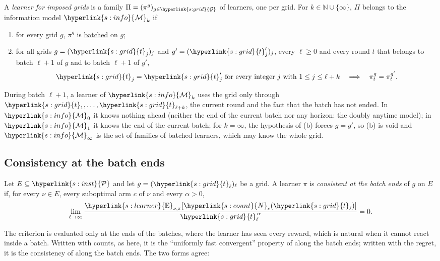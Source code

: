 \documentclass[11pt]{article}
\newcommand{\dt}[1]{\hypertarget{#1}{}}
\newcommand{\sy}[2]{{\hyperlink{#1}{#2}}}
\newcommand{\term}[2]{\hyperlink{#1}{#2}}
\newcommand{\1}{\mathbf{1}}
\newcommand{\Nat}{\mathbb{N}}
\newcommand{\cP}{\sy{s:inst}{\mathcal P}}
\newcommand{\Enu}{\sy{s:learner}{\mathbb E}}
\newcommand{\Ng}{\sy{s:count}{N}}
\newcommand{\Gr}{\sy{s:grid}{\mathcal G}}
\newcommand{\tl}{\sy{s:grid}{t}}
\newcommand{\Mk}[1]{\sy{s:info}{\mathcal M}_{#1}}
\newcommand{\batched}{\term{t:batched}{batched}}
\begin{document}
\begin{definition}\label{def:infomodel}
\dt{s:info}A \emph{learner for imposed grids} is a family $\Pi=(\pi^g)_{g\in\Gr}$ of learners, one
per grid. For $k\in\Nat\cup\{\infty\}$, $\Pi$ belongs to the information model $\Mk{k}$ if
\begin{enumerate}[label=(\alph*)]
\item for every grid $g$, $\pi^g$ is \batched{} on $g$;
\item for all grids $g=(\tl_j)_j$ and $g'=(\tl'_j)_j$, every $\ell\ge0$ and every round $t$ that
  belongs to batch $\ell+1$ of $g$ and to batch $\ell+1$ of $g'$,
  \begin{equation*}
    \tl_j=\tl'_j\ \text{for every integer}\ j\ \text{with}\ 1\le j\le\ell+k
    \quad\Longrightarrow\quad\pi^g_t=\pi^{g'}_t .
  \end{equation*}
\end{enumerate}
\end{definition}

During batch $\ell+1$, a learner of $\Mk{k}$ uses the grid only through $\tl_1,\dots,\tl_{\ell+k}$,
the current round and the fact that the batch has not ended. In $\Mk{0}$ it knows nothing ahead
(neither the end of the current batch nor any horizon: the doubly anytime model); in $\Mk{1}$ it
knows the end of the current batch; for $k=\infty$, the hypothesis of (b) forces $g=g'$, so (b) is
void and $\Mk{\infty}$ is the set of families of batched learners, which may know the whole grid.

\subsection{Consistency at the batch ends}

\begin{definition}\label{def:consistent}
\dt{t:cons}Let $E\subseteq\cP$ and let $g=(\tl_\ell)_\ell$ be a grid. A learner $\pi$ is \emph{consistent at the
batch ends} of $g$ on $E$ if, for every $\nu\in E$, every suboptimal arm $c$ of $\nu$ and every
$\alpha>0$,
\begin{equation*}
  \lim_{\ell\to\infty}\frac{\Enu_{\nu,\pi}[\Ng_c(\tl_\ell)]}{\tl_\ell^{\,\alpha}}=0 .
\end{equation*}
\end{definition}

The criterion is evaluated only at the ends of the batches, where the learner has seen every
reward, which is natural when it cannot react inside a batch. Written with counts, as here, it is
the ``uniformly fast convergent'' property of \citet[Definition~1]{GMS19} along the batch ends;
written with the regret, it is the consistency of \citet[Definition~16.1]{LS} along the batch ends.
The two forms agree:
\end{document}
